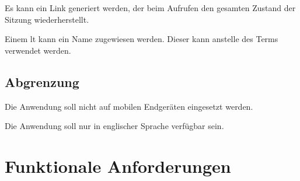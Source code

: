 \documentclass[parskip=full,11pt,twoside]{scrartcl}
\begin{document}
Es kann ein Link generiert werden, der beim Aufrufen den gesamten Zustand
der Sitzung wiederherstellt.

Einem \gls{lt} kann ein Name zugewiesen werden. Dieser kann anstelle des Terms
verwendet werden.


\subsection{Abgrenzung}

Die Anwendung soll nicht auf mobilen Endgeräten eingesetzt werden.

Die Anwendung soll nur in englischer Sprache verfügbar sein.

\pagebreak

\section{Funktionale Anforderungen}
\end{document}
